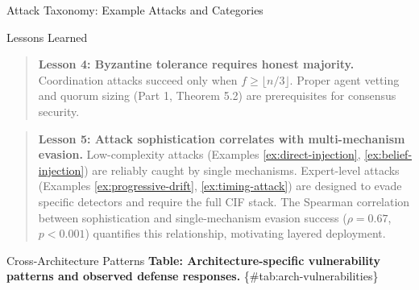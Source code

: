 \documentclass[
  ignorenonframetext,
]{beamer}
\begin{document}
\begin{frame}{Attack Taxonomy: Example Attacks and Categories}
\begin{block}{Lessons Learned}
\begin{quote}
\textbf{Lesson 4: Byzantine tolerance requires honest majority.}
Coordination attacks succeed only when \(f \geq \lfloor n/3 \rfloor\).
Proper agent vetting and quorum sizing (Part 1, Theorem 5.2) are
prerequisites for consensus security.
\end{quote}

\begin{quote}
\textbf{Lesson 5: Attack sophistication correlates with multi-mechanism
evasion.} Low-complexity attacks (Examples \ref{ex:direct-injection},
\ref{ex:belief-injection}) are reliably caught by single mechanisms.
Expert-level attacks (Examples \ref{ex:progressive-drift},
\ref{ex:timing-attack}) are designed to evade specific detectors and
require the full CIF stack. The Spearman correlation between
sophistication and single-mechanism evasion success (\(\rho = 0.67\),
\(p < 0.001\)) quantifies this relationship, motivating layered
deployment.
\end{quote}
\end{block}

\begin{block}{Cross-Architecture Patterns}
\protect{}\label{sec:cross-arch-patterns}
\textbf{Table: Architecture-specific vulnerability patterns and observed
defense responses.} \{\#tab:arch-vulnerabilities\}


\end{block}
\end{frame}
\end{document}
